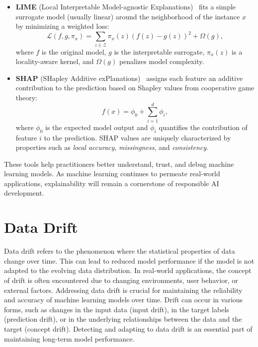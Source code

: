 \begin{itemize}
    \item \textbf{LIME} (Local Interpretable Model-agnostic Explanations)~\cite{lime} fits a
          simple surrogate model (usually linear) around the neighborhood of the instance $x$ by
          minimizing a weighted loss:
          \begin{equation}
              \mathcal{L}(f, g, \pi_x) = \sum_{z \in \mathcal{Z}} \pi_x(z) (f(z) - g(z))^2 + \Omega(g),
          \end{equation}
          where $f$ is the original model, $g$ is the interpretable surrogate, $\pi_x(z)$
          is a locality-aware kernel, and $\Omega(g)$ penalizes model complexity.

    \item \textbf{SHAP} (SHapley Additive exPlanations)~\cite{shap} assigns each feature an
          additive contribution to the prediction based on Shapley values from cooperative game theory:
          \begin{equation}
              f(x) = \phi_0 + \sum_{i=1}^{d} \phi_i,
          \end{equation}
          where $\phi_0$ is the expected model output and $\phi_i$ quantifies the
          contribution of feature $i$ to the prediction. SHAP values are uniquely
          characterized by properties such as \textit{local accuracy},
          \textit{missingness}, and \textit{consistency}.
\end{itemize}

These tools help practitioners better understand, trust, and debug machine
learning models. As machine learning continues to permeate real-world
applications, explainability will remain a cornerstone of responsible AI
development.

\section{Data Drift}\label{sec:data_drift}
Data drift refers to the phenomenon where the statistical properties of data
change over time. This can lead to reduced model performance if the model is
not adapted to the evolving data distribution. In real-world applications, the
concept of drift is often encountered due to changing environments, user
behavior, or external factors. Addressing data drift is crucial for maintaining
the reliability and accuracy of machine learning models over time. Drift can
occur in various forms, such as changes in the input data (input drift), in the
target labels (prediction drift), or in the underlying relationships between
the data and the target (concept drift). Detecting and adapting to data drift
is an essential part of maintaining long-term model performance.

